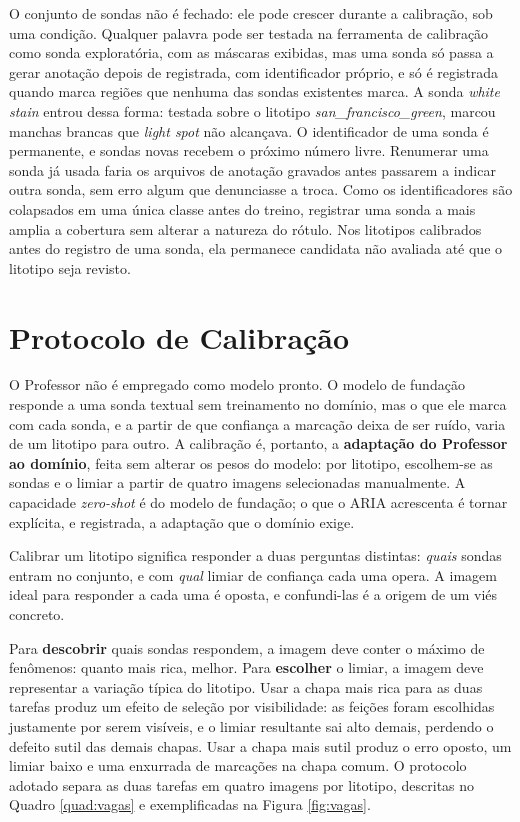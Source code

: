 O conjunto de sondas não é fechado: ele pode crescer durante a calibração, sob uma condição. Qualquer palavra pode ser testada na ferramenta de calibração como sonda exploratória, com as máscaras exibidas, mas uma sonda só passa a gerar anotação depois de registrada, com identificador próprio, e só é registrada quando marca regiões que nenhuma das sondas existentes marca. A sonda \textit{white stain} entrou dessa forma: testada sobre o litotipo \textit{san\_francisco\_green}, marcou manchas brancas que \textit{light spot} não alcançava. O identificador de uma sonda é permanente, e sondas novas recebem o próximo número livre. Renumerar uma sonda já usada faria os arquivos de anotação gravados antes passarem a indicar outra sonda, sem erro algum que denunciasse a troca. Como os identificadores são colapsados em uma única classe antes do treino, registrar uma sonda a mais amplia a cobertura sem alterar a natureza do rótulo. Nos litotipos calibrados antes do registro de uma sonda, ela permanece candidata não avaliada até que o litotipo seja revisto.

\section{Protocolo de Calibração}
\label{sec:protocolo}

O Professor não é empregado como modelo pronto. O modelo de fundação responde a uma sonda textual sem treinamento no domínio, mas o que ele marca com cada sonda, e a partir de que confiança a marcação deixa de ser ruído, varia de um litotipo para outro. A calibração é, portanto, a \textbf{adaptação do Professor ao domínio}, feita sem alterar os pesos do modelo: por litotipo, escolhem-se as sondas e o limiar a partir de quatro imagens selecionadas manualmente. A capacidade \textit{zero-shot} é do modelo de fundação; o que o ARIA acrescenta é tornar explícita, e registrada, a adaptação que o domínio exige.

Calibrar um litotipo significa responder a duas perguntas distintas: \textit{quais} sondas entram no conjunto, e com \textit{qual} limiar de confiança cada uma opera. A imagem ideal para responder a cada uma é oposta, e confundi-las é a origem de um viés concreto.

Para \textbf{descobrir} quais sondas respondem, a imagem deve conter o máximo de fenômenos: quanto mais rica, melhor. Para \textbf{escolher} o limiar, a imagem deve representar a variação típica do litotipo. Usar a chapa mais rica para as duas tarefas produz um efeito de seleção por visibilidade: as feições foram escolhidas justamente por serem visíveis, e o limiar resultante sai alto demais, perdendo o defeito sutil das demais chapas. Usar a chapa mais sutil produz o erro oposto, um limiar baixo e uma enxurrada de marcações na chapa comum.
O protocolo adotado separa as duas tarefas em quatro imagens por litotipo, descritas no Quadro \ref{quad:vagas} e exemplificadas na Figura \ref{fig:vagas}.

